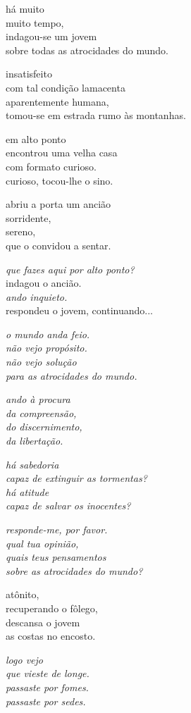 há muito\\
muito tempo,\\
indagou-se um jovem\\
sobre todas as atrocidades do mundo.

insatisfeito\\
com tal condição lamacenta\\
aparentemente humana,\\
tomou-se em estrada rumo às montanhas.

em alto ponto\\
encontrou uma velha casa\\
com formato curioso.\\
curioso, tocou-lhe o sino.

abriu a porta um ancião\\
sorridente,\\
sereno,\\
que o convidou a sentar.

\emph{que fazes aqui por alto ponto?}\\
indagou o ancião.\\
\emph{ando inquieto.}\\
respondeu o jovem, continuando...

\emph{o mundo anda feio.\\
não vejo propósito.\\
não vejo solução\\
para as atrocidades do mundo.}

\emph{ando à procura\\
da compreensão,\\
do discernimento,\\
da libertação.}

\emph{há sabedoria\\
capaz de extinguir as tormentas?\\
há atitude\\
capaz de salvar os inocentes?}

\emph{responde-me, por favor.\\
qual tua opinião,\\
quais teus pensamentos\\
sobre as atrocidades do mundo?}

atônito,\\
recuperando o fôlego,\\
descansa o jovem\\
as costas no encosto.

\emph{logo vejo\\
que vieste de longe.\\
passaste por fomes.\\
passaste por sedes.}

